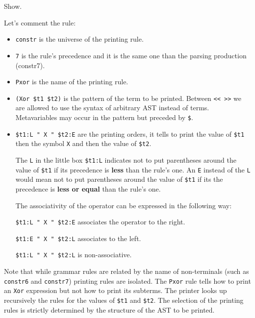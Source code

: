 \begin{coq_example}
Show.
\end{coq_example}

Let's comment the rule:
\begin{itemize}
\item \verb+constr+ is the universe of the printing rule.

\item \verb+7+ is the rule's precedence and it is the same one than the
  parsing production (constr7).

\item \verb+Pxor+ is the name of the printing rule.

\item \verb+(Xor $t1 $t2)+ is the pattern of the term to be
printed. Between \verb+<< >>+ we are allowed to use the syntax of
arbitrary AST instead of terms. Metavariables may occur in the pattern
but preceded by \verb+$+.

\item \verb+$t1:L " X " $t2:E+ are the printing
  orders, it tells to print the value of \verb+$t1+ then the symbol
  \verb+X+ and then the value of \verb+$t2+.

  The \verb+L+ in the little box \verb+$t1:L+ indicates not
  to put parentheses around the value of \verb+$t1+ if its precedence
  is {\bf less} than the rule's one. An \verb+E+ instead of the
  \verb+L+ would mean not to put parentheses around the value of
  \verb+$t1+ if its the precedence is {\bf less or equal} than the
  rule's one.

  The associativity of the operator can be expressed in the following
  way:

  \verb&$t1:L " X " $t2:E& associates the operator to the right.

  \verb&$t1:E " X " $t2:L& associates to the left.

  \verb&$t1:L " X " $t2:L& is non-associative.

\end{itemize}

Note that while grammar rules are related by the name of non-terminals
(such as {\tt constr6} and {\tt constr7}) printing rules are
isolated. The {\tt Pxor} rule tells how to print an {\tt Xor}
expression but not how to print its subterms.  The printer looks up
recursively the rules for the values of \verb+$t1+ and \verb+$t2+. The
selection of the printing rules is strictly determined by the
structure of the AST to be printed.

